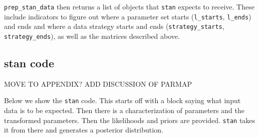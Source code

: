 \documentclass[
  article]{jss}
\begin{document}
\texttt{prep\_stan\_data} then returns a list of objects that
\texttt{stan} expects to receive. These include indicators to figure out
where a parameter set starts (\texttt{l\_starts}, \texttt{l\_ends}) and
ends and where a data strategy starts and ends
(\texttt{strategy\_starts}, \texttt{strategy\_ends}), as well as the
matrices described above.

\hypertarget{stan-code}{%
\subsection{stan code}\label{stan-code}}

MOVE TO APPENDIX? ADD DISCUSSION OF PARMAP

Below we show the \texttt{stan} code. This starts off with a block
saying what input data is to be expected. Then there is a
characterization of parameters and the transformed parameters. Then the
likelihoods and priors are provided. \texttt{stan} takes it from there
and generates a posterior distribution.
\end{document}
